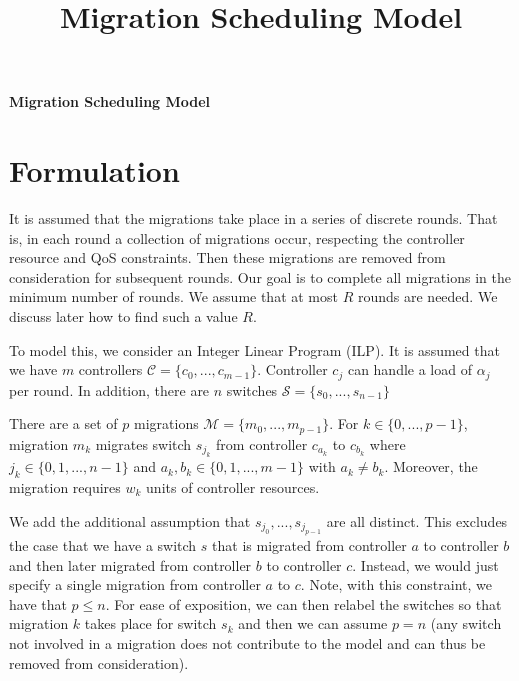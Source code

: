 \documentclass[letterpaper,12pt,titlepage,oneside,final]{article}
\title{Migration Scheduling Model}
\let\oldcenter\center
\let\oldendcenter\endcenter
\renewenvironment{center}{\setlength\topsep{0pt}\oldcenter}{\oldendcenter}
\begin{document}
\pagestyle{empty}


\pagestyle{plain}

\newpage %

\cleardoublepage

\newpage

\begin{center}
    \Huge{\bf Migration Scheduling Model}
\end{center}

\section{Formulation}

\noindent It is assumed that the migrations take place in a series of discrete rounds. That is, in each round a collection of migrations occur, respecting the controller resource and QoS constraints. Then these migrations are removed from consideration for subsequent rounds. Our goal is to complete all migrations in the minimum number of rounds. We assume that at most $R$ rounds are needed. We discuss later how to find such a value $R$.

To model this, we consider an Integer Linear Program (ILP). It is assumed that we have $m$ controllers $\mathcal{C} = \{c_{0}, ..., c_{m-1}\}$. Controller $c_{j}$ can handle a load of $\alpha_{j}$ per round. In addition, there are $n$ switches $\mathcal{S} = \{s_{0}, ..., s_{n-1}\}$

There are a set of $p$ migrations $\mathcal{M} = \{m_{0}, ..., m_{p-1}\}$. For $k \in \{0, ..., p-1\}$, migration $m_{k}$ migrates switch $s_{j_{k}}$ from controller $c_{a_{k}}$ to $c_{b_{k}}$ where $j_{k} \in \{0, 1, ..., n - 1\}$ and $a_{k}, b_{k} \in \{0, 1, ..., m - 1\}$ with $a_{k} \neq b_{k}$. Moreover, the migration requires $w_{k}$ units of controller resources. 

We add the additional assumption that $s_{j_{0}}, ..., s_{j_{p-1}}$ are all distinct. This excludes the case that we have a switch $s$ that is migrated from controller $a$ to controller $b$ and then later migrated from controller $b$ to controller $c$. Instead, we would just specify a single migration from controller $a$ to $c$. Note, with this constraint, we have that $p \leq n$. For ease of exposition, we can then relabel the switches so that migration $k$ takes place for switch $s_{k}$ and then we can assume $p = n$ (any switch not involved in a migration does not contribute to the model and can thus be removed from consideration).
\end{document}
